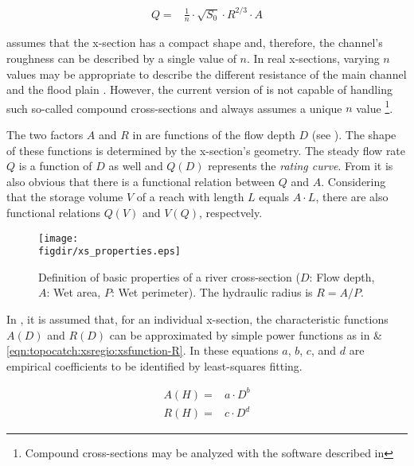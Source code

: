\begin{align}
  Q= & \frac{1}{n} \cdot \sqrt{S_0} \cdot R^{2/3} \cdot A \label{eqn:topocatch:xsregio:manning}
\end{align}

 assumes that the x-section has a compact shape and, therefore, the channel's roughness can be described by a single value of $n$. In real x-sections, varying $n$ values may be appropriate to describe the different resistance of the main channel and the flood plain \citep[][]{Cunge1980}. However, the current version of  is not capable of handling such so-called compound cross-sections and always assumes a unique $n$ value \footnote{Compound cross-sections may be analyzed with the software described in }. 

The two factors $A$ and $R$ in  are functions of the flow depth $D$ (see ). The shape of these functions is determined by the x-section's geometry. The steady flow rate $Q$ is a function of $D$ as well and $Q(D)$ represents the \emph{rating curve}. From  it is also obvious that there is a functional relation between $Q$ and $A$. Considering that the storage volume $V$ of a reach with length $L$ equals $A \cdot L$, there are also functional relations $Q(V)$ and $V(Q)$, respectvely.

\begin{figure}
  \centering
  \texttt{[image: \\figdir/xs\_properties.eps]}
  \caption[Definition of basic properties of a river cross-section.]{Definition of basic properties of a river cross-section ($D$: Flow depth, $A$: Wet area, $P$: Wet perimeter). The hydraulic radius is $R=A/P$. \label{fig:topocatch:xsregio:xsection}}
\end{figure}

In , it is assumed that, for an individual x-section, the characteristic functions $A(D)$ and $R(D)$ can be approximated by simple power functions as in  \& \ref{eqn:topocatch:xsregio:xsfunction-R}. In these equations $a$, $b$, $c$, and $d$ are empirical coefficients to be identified by least-squares fitting.

\begin{align}
  A(H)= & a \cdot D ^b \label{eqn:topocatch:xsregio:xsfunction-A} \\
  R(H)= & c \cdot D ^d \label{eqn:topocatch:xsregio:xsfunction-R}
\end{align}

